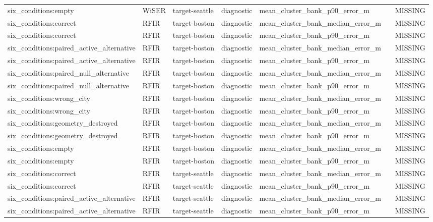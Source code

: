 \begin{longtable}{lllllll}
six\_conditions:empty & WiSER & target-seattle & diagnostic & mean\_cluster\_bank\_p90\_error\_m &  & MISSING \\
six\_conditions:correct & RFIR & target-boston & diagnostic & mean\_cluster\_bank\_median\_error\_m &  & MISSING \\
six\_conditions:correct & RFIR & target-boston & diagnostic & mean\_cluster\_bank\_p90\_error\_m &  & MISSING \\
six\_conditions:paired\_active\_alternative & RFIR & target-boston & diagnostic & mean\_cluster\_bank\_median\_error\_m &  & MISSING \\
six\_conditions:paired\_active\_alternative & RFIR & target-boston & diagnostic & mean\_cluster\_bank\_p90\_error\_m &  & MISSING \\
six\_conditions:paired\_null\_alternative & RFIR & target-boston & diagnostic & mean\_cluster\_bank\_median\_error\_m &  & MISSING \\
six\_conditions:paired\_null\_alternative & RFIR & target-boston & diagnostic & mean\_cluster\_bank\_p90\_error\_m &  & MISSING \\
six\_conditions:wrong\_city & RFIR & target-boston & diagnostic & mean\_cluster\_bank\_median\_error\_m &  & MISSING \\
six\_conditions:wrong\_city & RFIR & target-boston & diagnostic & mean\_cluster\_bank\_p90\_error\_m &  & MISSING \\
six\_conditions:geometry\_destroyed & RFIR & target-boston & diagnostic & mean\_cluster\_bank\_median\_error\_m &  & MISSING \\
six\_conditions:geometry\_destroyed & RFIR & target-boston & diagnostic & mean\_cluster\_bank\_p90\_error\_m &  & MISSING \\
six\_conditions:empty & RFIR & target-boston & diagnostic & mean\_cluster\_bank\_median\_error\_m &  & MISSING \\
six\_conditions:empty & RFIR & target-boston & diagnostic & mean\_cluster\_bank\_p90\_error\_m &  & MISSING \\
six\_conditions:correct & RFIR & target-seattle & diagnostic & mean\_cluster\_bank\_median\_error\_m &  & MISSING \\
six\_conditions:correct & RFIR & target-seattle & diagnostic & mean\_cluster\_bank\_p90\_error\_m &  & MISSING \\
six\_conditions:paired\_active\_alternative & RFIR & target-seattle & diagnostic & mean\_cluster\_bank\_median\_error\_m &  & MISSING \\
six\_conditions:paired\_active\_alternative & RFIR & target-seattle & diagnostic & mean\_cluster\_bank\_p90\_error\_m &  & MISSING \\

\end{longtable}
